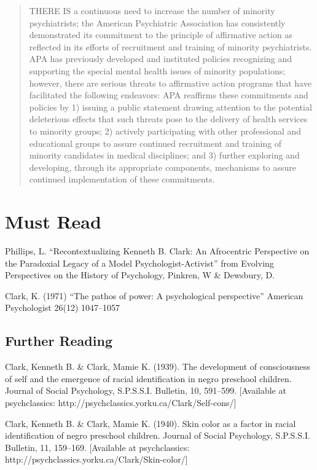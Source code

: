 \begin{quote}

THERE IS a continuous need to increase the number of minority psychiatrists; the American Psychiatric Association has consistently demonstrated its commitment to the principle of affirmative action as reflected in its efforts of recruitment and training of minority psychiatrists. APA has previously developed and instituted policies recognizing and supporting the special mental health issues of minority populations; however, there are serious threats to affirmative action programs that have facilitated the following endeavors: APA reaffirms these commitments and policies by 1) issuing a public statement drawing attention to the potential deleterious effects that such threats pose to the delivery of health services to minority groups; 2) actively participating with other professional and educational groups to assure continued recruitment and training of minority candidates in medical disciplines; and 3) further exploring and developing, through its appropriate components, mechanisms to assure continued implementation of these commitments.
\end{quote}

\section{Must Read}
\label{mustread}

Phillips, L. ``Recontextualizing Kenneth B. Clark: An Afrocentric Perspective on the Paradoxial Legacy of a Model Psychologist-Activist'' from Evolving Perspectives on the History of Psychology, Pinkren, W \& Dewsbury, D.

Clark, K. (1971) ``The pathos of power: A psychological perspective'' American Psychologist 26(12) 1047--1057

\subsection{Further Reading}
\label{furtherreading}

Clark, Kenneth B. \& Clark, Mamie K. (1939). The development of consciousness of self and the emergence of racial identification in negro preschool children. Journal of Social Psychology, S.P.S.S.I. Bulletin, 10, 591--599. [Available at psychclassics: http:\slash \slash psychclassics.yorku.ca\slash Clark\slash Self-cons\slash ]

Clark, Kenneth B. \& Clark, Mamie K. (1940). Skin color as a factor in racial identification of negro preschool children. Journal of Social Psychology, S.P.S.S.I. Bulletin, 11, 159--169. [Available at psychclassics: http:\slash \slash psychclassics.yorku.ca\slash Clark\slash Skin-color\slash ]

